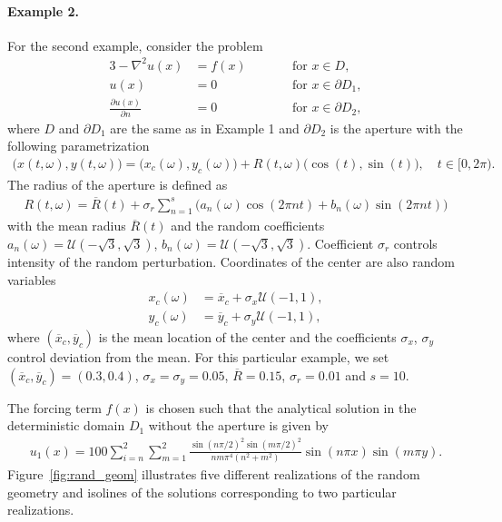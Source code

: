 \paragraph{\bf{Example 2.}}
For the second example, consider the problem
\begin{alignat*}{3}
	-\nabla^2 u(x) & = f(x)  &\qquad &\text{for } x \in D,
	\\ \nonumber
	u(x)           & = 0  &\qquad &\text{for } x \in \partial D_1,
	\\ \nonumber
	\frac{\partial u(x)}{\partial n}           & = 0  &\qquad &\text{for } x \in \partial D_2,
\end{alignat*}
where $D$ and $\partial D_1$ are the same as in Example 1 and $\partial D_2$ is the aperture with the following parametrization
\begin{align*}
	\big(x(t,\omega),y(t,\omega)\big) = \big(x_c(\omega),y_c(\omega)\big) + R(t,\omega) \big(\cos(t),\sin(t)\big), \quad  t \in [0,2 \pi).
\end{align*}
The radius of the aperture is defined as
\begin{align*}
	R(t,\omega) = \overline{R}(t) + \sigma_r \sum_{n=1}^s \Big( a_n(\omega) \cos(2\pi n t) + b_n(\omega) \sin(2\pi n t) \Big)
\end{align*}
with the mean radius $\overline{R}(t)$ and the random coefficients $a_n(\omega) = \mathcal{U}(-\sqrt{3},\sqrt{3})$, $b_n(\omega) = \mathcal{U}(-\sqrt{3},\sqrt{3})$.
Coefficient $\sigma_r$ controls intensity of the random perturbation.
Coordinates of the center are also random variables
\begin{align*}
	x_c(\omega) &= \overline{x}_c + \sigma_x \mathcal{U}(-1,1),
	\\ \nonumber
	y_c(\omega) &= \overline{y}_c + \sigma_y \mathcal{U}(-1,1),
\end{align*}
where $(\overline{x}_c,\overline{y}_c)$ is the mean location of the center and the coefficients $\sigma_x$, $\sigma_y$ control deviation from the mean.
For this particular example, we set $(\overline{x}_c,\overline{y}_c) = (0.3,0.4)$, $\sigma_x=\sigma_y=0.05$, $\overline{R}=0.15$, $\sigma_r=0.01$ and $s=10$.

The forcing term $f(x)$ is chosen such that the analytical solution in the deterministic domain $D_1$ without the aperture is given by
\begin{align*}
    u_1(x) = 
    100 \sum_{i=n}^2 \sum_{m=1}^2 \frac{ \sin(n \pi /2)^2 \sin(m \pi /2)^2 }{ nm\pi^4 (n^2+m^2) }
    \sin(n\pi x) \sin(m\pi y).
\end{align*}
Figure~\ref{fig:rand_geom} illustrates five different realizations of the random geometry and isolines of the solutions corresponding to two particular realizations.

